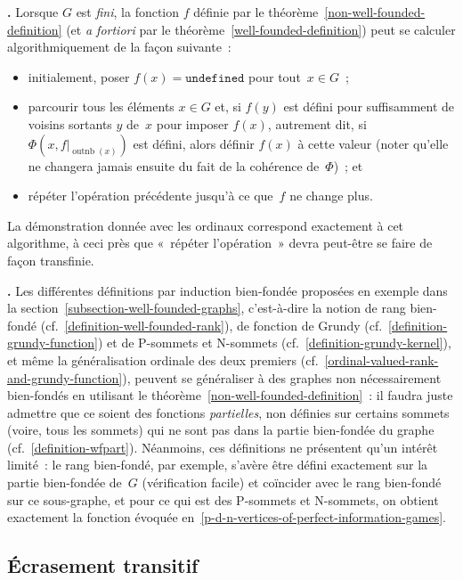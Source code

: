 \documentclass[12pt,a4paper]{article}
\theoremstyle{definition}
\newcommand\thingy{%
\refstepcounter{comcnt}\smallskip\noindent\textbf{\thecomcnt.} }
\newcommand{\outnb}{\operatorname{outnb}}
\begin{document}
\thingy\label{non-well-founded-induction-algorithm} Lorsque $G$ est
\emph{fini}, la fonction $f$ définie par le
théorème \ref{non-well-founded-definition} (et \textit{a fortiori} par
le théorème \ref{well-founded-definition}) peut se calculer
algorithmiquement de la façon suivante :
\begin{itemize}
\item initialement, poser $f(x) = \mathtt{undefined}$ pour tout $x\in
  G$ ;
\item parcourir tous les éléments $x\in G$ et, si $f(y)$ est défini
  pour suffisamment de voisins sortants $y$ de $x$ pour imposer
  $f(x)$, autrement dit, si $\Phi(x, f|_{\outnb(x)})$ est défini,
  alors définir $f(x)$ à cette valeur (noter qu'elle ne changera
  jamais ensuite du fait de la cohérence de $\Phi$) ; et
\item répéter l'opération précédente jusqu'à ce que $f$ ne change
  plus.
\end{itemize}
La démonstration donnée avec les ordinaux correspond exactement à cet
algorithme, à ceci près que « répéter l'opération » devra peut-être se
faire de façon transfinie.

\thingy Les différentes définitions par induction bien-fondée
proposées en exemple dans la
section \ref{subsection-well-founded-graphs}, c'est-à-dire la notion
de rang bien-fondé (cf. \ref{definition-well-founded-rank}), de
fonction de Grundy (cf. \ref{definition-grundy-function}) et de
P-sommets et N-sommets (cf. \ref{definition-grundy-kernel}), et même
la généralisation ordinale des deux premiers
(cf. \ref{ordinal-valued-rank-and-grundy-function}), peuvent se
généraliser à des graphes non nécessairement bien-fondés en utilisant
le théorème \ref{non-well-founded-definition} : il faudra juste
admettre que ce soient des fonctions \emph{partielles}, non définies
sur certains sommets (voire, tous les sommets) qui ne sont pas dans la
partie bien-fondée du graphe (cf. \ref{definition-wfpart}).
Néanmoins, ces définitions ne présentent qu'un intérêt limité : le
rang bien-fondé, par exemple, s'avère être défini exactement sur la
partie bien-fondée de $G$ (vérification facile) et coïncider avec le
rang bien-fondé sur ce sous-graphe, et pour ce qui est des P-sommets
et N-sommets, on obtient exactement la fonction évoquée
en \ref{p-d-n-vertices-of-perfect-information-games}.



\subsection{Écrasement transitif}
\end{document}
